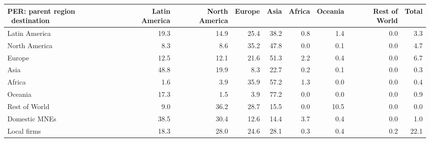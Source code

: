 \begin{tabular}{lrrrrrrrr}
\toprule
PER: parent region \ destination & Latin America & North America & Europe & Asia & Africa & Oceania & Rest of World & Total \\
\midrule
Latin America & 19.3 & 14.9 & 25.4 & 38.2 & 0.8 & 1.4 & 0.0 & 3.3 \\
North America & 8.3 & 8.6 & 35.2 & 47.8 & 0.0 & 0.1 & 0.0 & 4.7 \\
Europe & 12.5 & 12.1 & 21.6 & 51.3 & 2.2 & 0.4 & 0.0 & 6.7 \\
Asia & 48.8 & 19.9 & 8.3 & 22.7 & 0.2 & 0.1 & 0.0 & 0.3 \\
Africa & 1.6 & 3.9 & 35.9 & 57.2 & 1.3 & 0.0 & 0.0 & 0.4 \\
Oceania & 17.3 & 1.5 & 3.9 & 77.2 & 0.0 & 0.0 & 0.0 & 0.9 \\
Rest of World & 9.0 & 36.2 & 28.7 & 15.5 & 0.0 & 10.5 & 0.0 & 0.0 \\
Domestic MNEs & 38.5 & 30.4 & 12.6 & 14.4 & 3.7 & 0.4 & 0.0 & 1.0 \\
Local firms & 18.3 & 28.0 & 24.6 & 28.1 & 0.3 & 0.4 & 0.2 & 22.1 \\
\bottomrule
\end{tabular}
